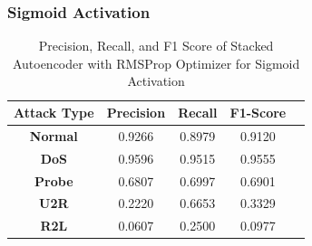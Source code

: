 \documentclass[12pt, a4paper]{report}
\begin{document}
\subsubsection{Sigmoid Activation}

\begin{table}[ht]
\centering
\captionsetup{justification=centering,margin=2cm}
\begin{tabular}{|c|c|c|c|c|}
\hline
\multicolumn{1}{|c|}{\textbf{Attack Type}} & \multicolumn{1}{c|}{\textbf{Precision}} & \multicolumn{1}{c|}{\textbf{Recall}} & \multicolumn{1}{c|}{\textbf{F1-Score}} \\ \hline
\textbf{Normal}        & 0.9266                                   & 0.8979                                & 0.9120                                                                  \\ \hline
\textbf{DoS}           & 0.9596                                  & 0.9515                                &  0.9555                                                                    \\ \hline
\textbf{Probe}         & 0.6807                                  & 0.6997                                & 0.6901                                                                  \\ \hline
\textbf{U2R}           & 0.2220                                    & 0.6653                                & 0.3329                                                                   \\ \hline
\textbf{R2L}           & 0.0607                                      & 0.2500                                   & 0.0977                                                            \\ \hline         \end{tabular}
\caption{Precision, Recall, and F1 Score of Stacked Autoencoder with RMSProp Optimizer for Sigmoid Activation}
\label{prf1_rmsprop_sigmoid_auto}
\end{table}
\end{document}
